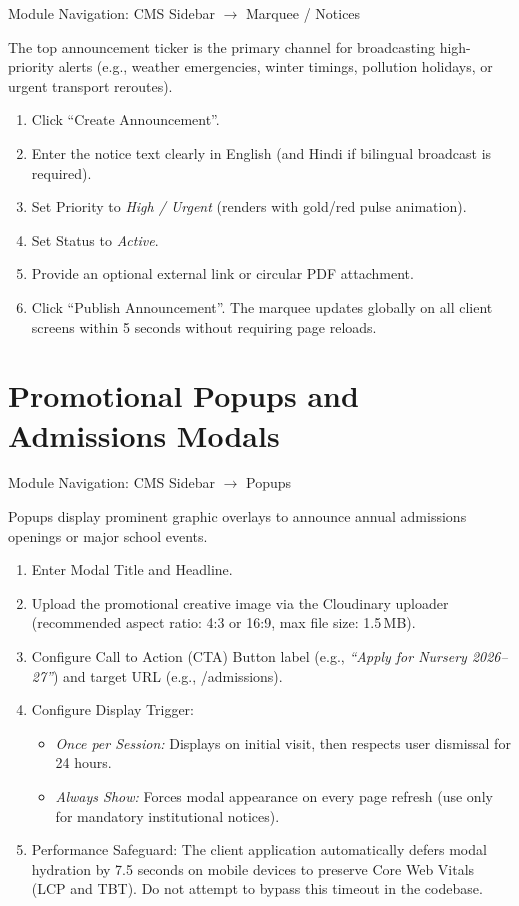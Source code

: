 \documentclass[11pt,a4paper,oneside]{report}
\def\textbf#1{#1}
\def\texttt#1{#1}
\def\&{and}
\begin{document}
\textbf{Module Navigation:} CMS Sidebar $\rightarrow$ \texttt{Marquee / Notices}

The top announcement ticker is the primary channel for broadcasting high-priority alerts
(e.g., weather emergencies, winter timings, pollution holidays, or urgent transport reroutes).

\begin{enumerate}
  \item Click \textbf{``Create Announcement''}.
  \item Enter the notice text clearly in English (and Hindi if bilingual broadcast is required).
  \item Set \textbf{Priority} to \textit{High / Urgent} (renders with gold/red pulse animation).
  \item Set \textbf{Status} to \textit{Active}.
  \item Provide an optional external link or circular PDF attachment.
  \item Click \textbf{``Publish Announcement''}. The marquee updates globally on all client screens within 5 seconds without requiring page reloads.
\end{enumerate}

\section{Promotional Popups \& Admissions Modals}

\textbf{Module Navigation:} CMS Sidebar $\rightarrow$ \texttt{Popups}

Popups display prominent graphic overlays to announce annual admissions openings or major school events.

\begin{enumerate}
  \item Enter \textbf{Modal Title} and \textbf{Headline}.
  \item Upload the promotional creative image via the Cloudinary uploader (recommended aspect ratio: 4:3 or 16:9, max file size: 1.5\,MB).
  \item Configure \textbf{Call to Action (CTA) Button} label (e.g., \textit{``Apply for Nursery 2026--27''}) and target URL (e.g., \texttt{/admissions}).
  \item Configure \textbf{Display Trigger}:
        \begin{itemize}
          \item \textit{Once per Session:} Displays on initial visit, then respects user dismissal for 24 hours.
          \item \textit{Always Show:} Forces modal appearance on every page refresh (use only for mandatory institutional notices).
        \end{itemize}
  \item \textbf{Performance Safeguard:} The client application automatically defers modal hydration by \textbf{7.5 seconds} on mobile devices to preserve Core Web Vitals (LCP and TBT). Do not attempt to bypass this timeout in the codebase.
\end{enumerate}
\end{document}
